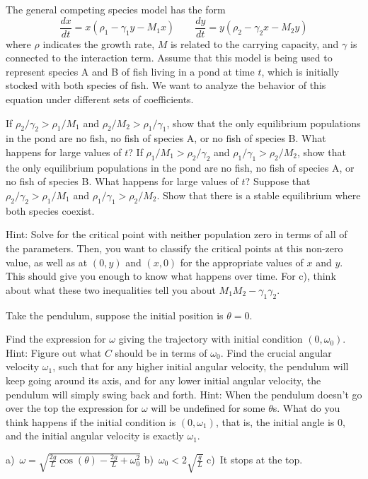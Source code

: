 \begin{exercise}
The general competing species model has the form
\[ \frac{dx}{dt} = x(\rho_1 - \gamma_1 y - M_1 x) \qquad \frac{dy}{dt} = y(\rho_2 - \gamma_2 x - M_2 y) \] where $\rho$ indicates the growth rate, $M$ is related to the carrying capacity, and $\gamma$ is connected to the interaction term. Assume that this model is being used to represent species A and B of fish living in a pond at time $t$, which is initially stocked with both species of fish. We want to analyze the behavior of this equation under different sets of coefficients.
\begin{tasks}
\task If $\rho_2/\gamma_2 > \rho_1/M_1$ and $\rho_2/M_2 > \rho_1/\gamma_1$, show that the only equilibrium populations in the pond are no fish, no fish of species A, or no fish of species B. What happens for large values of $t$?
\task If $ \rho_1/M_1 > \rho_2/\gamma_2 $ and $\rho_1/\gamma_1 > \rho_2/M_2$, show that the only equilibrium populations in the pond are no fish, no fish of species A, or no fish of species B. What happens for large values of $t$?
\task Suppose that $\rho_2/\gamma_2 > \rho_1/M_1$ and $\rho_1/\gamma_1 > \rho_2/M_2$. Show that there is a stable equilibrium where both species coexist. 
\end{tasks}
\end{exercise}
\comboSol{%
}
{%
Hint: Solve for the critical point with neither population zero in terms of all of the parameters. Then, you want to classify the critical points at this non-zero value, as well as at $(0, y)$ and $(x,0)$ for the appropriate values of $x$ and $y$. This should give you enough to know what happens over time. For c), think about what these two inequalities tell you about $M_1M_2 - \gamma_1\gamma_2$.
}

\begin{exercise}[challenging]
Take the pendulum, suppose the initial position is $\theta = 0$.
\begin{tasks}
\task
Find the expression for $\omega$ giving the trajectory
with initial condition $(0,\omega_0)$.  Hint: Figure out what $C$
should be in terms of $\omega_0$.
\task
Find the crucial angular velocity $\omega_1$, such that
for any higher initial angular velocity,
the pendulum will keep going around its
axis, and for any lower initial angular velocity, the pendulum will simply
swing back and forth.
Hint: When the pendulum doesn't go over the top the expression for $\omega$
will be undefined for some $\theta$s.
\task
What do you think happens if the initial condition is $(0,\omega_1)$,
that is, the initial angle is 0, and the initial angular velocity is exactly
$\omega_1$.
\end{tasks}
\end{exercise}
\comboSol{%
}
{%
a)~$\omega = \sqrt{\frac{2g}{L}\cos(\theta) - \frac{2g}{L} + \omega_0^2}$ \quad b)~$\omega_0 < 2\sqrt{\frac{g}{L}}$ \quad c)~It stops at the top.
}

